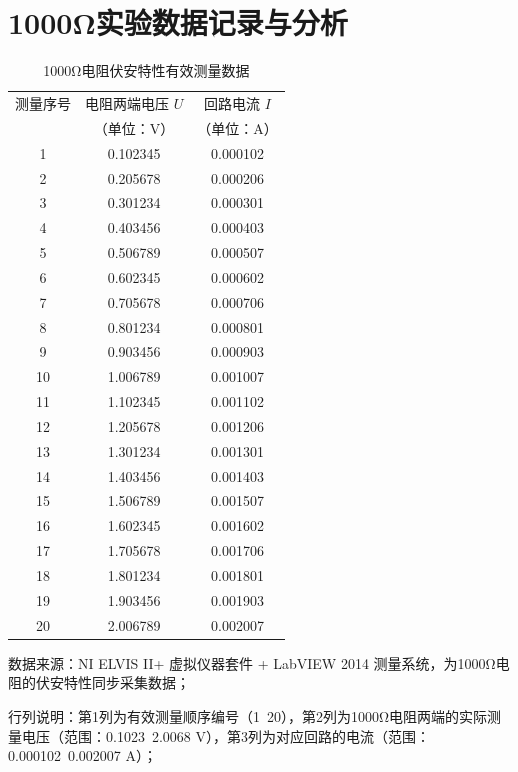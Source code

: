 \documentclass[11pt]{article}
\begin{document}
\section{1000Ω实验数据记录与分析}

\begin{table}[htbp]
  \centering
  \caption{1000Ω电阻伏安特性有效测量数据}
  \label{tab:1000ohm_voltamp_valid}  %
  \begin{threeparttable}
    \begin{tabular}{c c c}
      \toprule
      测量序号 & 电阻两端电压 $U$ & 回路电流 $I$ \\
      & （单位：$\text{V}$） & （单位：$\text{A}$） \\
      \midrule
      1  & 0.102345 & 0.000102 \\
      2  & 0.205678 & 0.000206 \\
      3  & 0.301234 & 0.000301 \\
      4  & 0.403456 & 0.000403 \\
      5  & 0.506789 & 0.000507 \\
      6  & 0.602345 & 0.000602 \\
      7  & 0.705678 & 0.000706 \\
      8  & 0.801234 & 0.000801 \\
      9  & 0.903456 & 0.000903 \\
      10 & 1.006789 & 0.001007 \\
      11 & 1.102345 & 0.001102 \\
      12 & 1.205678 & 0.001206 \\
      13 & 1.301234 & 0.001301 \\
      14 & 1.403456 & 0.001403 \\
      15 & 1.506789 & 0.001507 \\
      16 & 1.602345 & 0.001602 \\
      17 & 1.705678 & 0.001706 \\
      18 & 1.801234 & 0.001801 \\
      19 & 1.903456 & 0.001903 \\
      20 & 2.006789 & 0.002007 \\
      \bottomrule
    \end{tabular}
    
    \begin{tablenotes}
      \item[1] 数据来源：NI ELVIS II+ 虚拟仪器套件 + LabVIEW 2014 测量系统，为1000Ω电阻的伏安特性同步采集数据；
      \item[2] 行列说明：第1列为有效测量顺序编号（1~20），第2列为1000Ω电阻两端的实际测量电压（范围：0.1023~2.0068 V），第3列为对应回路的电流（范围：0.000102~0.002007 A）；
      

\end{tablenotes}
\end{threeparttable}
\end{table}
\end{document}

